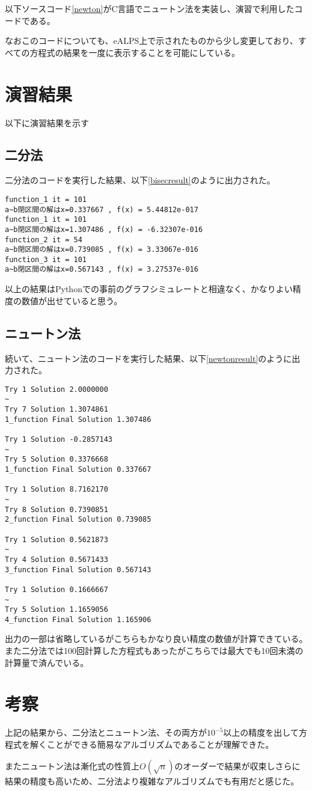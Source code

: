 \documentclass[a4paper,11pt]{jsarticle}
\begin{document}
    以下ソースコード\ref{newton}がC言語でニュートン法を実装し、演習で利用したコードである。
    

    なおこのコードについても、eALPS上で示されたものから少し変更しており、すべての方程式の結果を一度に表示することを可能にしている。

    \section{演習結果}
    以下に演習結果を示す
    \subsection{二分法}
    二分法のコードを実行した結果、以下\ref{bisecresult}のように出力された。
    \begin{lstlisting}[caption=bisection\_result, label=bisecresult]
function_1 it = 101
a~b閉区間の解はx=0.337667 , f(x) = 5.44812e-017
function_1 it = 101
a~b閉区間の解はx=1.307486 , f(x) = -6.32307e-016
function_2 it = 54
a~b閉区間の解はx=0.739085 , f(x) = 3.33067e-016
function_3 it = 101
a~b閉区間の解はx=0.567143 , f(x) = 3.27537e-016
    \end{lstlisting}

    以上の結果はPythonでの事前のグラフシミュレートと相違なく、かなりよい精度の数値が出せていると思う。

    \subsection{ニュートン法}
    続いて、ニュートン法のコードを実行した結果、以下\ref{newtonresult}のように出力された。
    \begin{lstlisting}[caption=newton\_result, label=newtonresult]
Try 1 Solution 2.0000000
~
Try 7 Solution 1.3074861
1_function Final Solution 1.307486

Try 1 Solution -0.2857143
~
Try 5 Solution 0.3376668
1_function Final Solution 0.337667

Try 1 Solution 8.7162170
~
Try 8 Solution 0.7390851
2_function Final Solution 0.739085

Try 1 Solution 0.5621873
~
Try 4 Solution 0.5671433
3_function Final Solution 0.567143

Try 1 Solution 0.1666667
~
Try 5 Solution 1.1659056
4_function Final Solution 1.165906
    \end{lstlisting}

    出力の一部は省略しているがこちらもかなり良い精度の数値が計算できている。また二分法では100回計算した方程式もあったがこちらでは最大でも10回未満の計算量で済んでいる。

    \section{考察}
    上記の結果から、二分法とニュートン法、その両方が$10^{-5}$以上の精度を出して方程式を解くことができる簡易なアルゴリズムであることが理解できた。
    
    またニュートン法は漸化式の性質上$O(\sqrt{n})$のオーダーで結果が収束しさらに結果の精度も高いため、二分法より複雑なアルゴリズムでも有用だと感じた。
\end{document}
